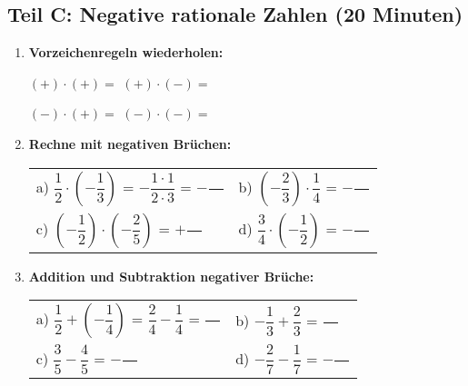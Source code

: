 \subsection*{Teil C: Negative rationale Zahlen (20 Minuten)}

\begin{enumerate}[label=\arabic*.]
    \item \textbf{Vorzeichenregeln wiederholen:}
    \vspace{0.5cm}

    $(+) \cdot (+) = $ \underline{\hspace{2cm}} \quad $(+) \cdot (-) = $ \underline{\hspace{2cm}}

    $(-) \cdot (+) = $ \underline{\hspace{2cm}} \quad $(-) \cdot (-) = $ \underline{\hspace{2cm}}

    \vspace{1cm}

    \item \textbf{Rechne mit negativen Brüchen:}
    \vspace{0.5cm}

    \begin{tabular}{ll}
        a) $\dfrac{1}{2} \cdot \left(-\dfrac{1}{3}\right)$ = $-\dfrac{1 \cdot 1}{2 \cdot 3}$ = $-\dfrac{\phantom{00}}{\phantom{00}}$ & b) $\left(-\dfrac{2}{3}\right) \cdot \dfrac{1}{4}$ = $-\dfrac{\phantom{00}}{\phantom{00}}$ \\[4ex]
        c) $\left(-\dfrac{1}{2}\right) \cdot \left(-\dfrac{2}{5}\right)$ = $+\dfrac{\phantom{00}}{\phantom{00}}$ & d) $\dfrac{3}{4} \cdot \left(-\dfrac{1}{2}\right)$ = $-\dfrac{\phantom{00}}{\phantom{00}}$
    \end{tabular}

    \vspace{1cm}

    \item \textbf{Addition und Subtraktion negativer Brüche:}
    \vspace{0.5cm}

    \begin{tabular}{ll}
        a) $\dfrac{1}{2} + \left(-\dfrac{1}{4}\right)$ = $\dfrac{2}{4} - \dfrac{1}{4}$ = $\dfrac{\phantom{00}}{\phantom{00}}$ & b) $-\dfrac{1}{3} + \dfrac{2}{3}$ = $\dfrac{\phantom{00}}{\phantom{00}}$ \\[4ex]
        c) $\dfrac{3}{5} - \dfrac{4}{5}$ = $-\dfrac{\phantom{00}}{\phantom{00}}$ & d) $-\dfrac{2}{7} - \dfrac{1}{7}$ = $-\dfrac{\phantom{00}}{\phantom{00}}$
    \end{tabular}

\end{enumerate}